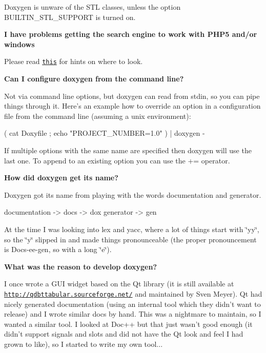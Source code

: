 \begin{DoxyEnumerate}
Doxygen is unware of the STL classes, unless the option BUILTIN\_\-STL\_\-SUPPORT is turned on.


\item {\bfseries I have problems getting the search engine to work with PHP5 and/or windows}

Please read \href{searchengine.html}{\tt this} for hints on where to look.


\item {\bfseries Can I configure doxygen from the command line?}

Not via command line options, but doxygen can read from {\ttfamily stdin}, so you can pipe things through it. Here's an example how to override an option in a configuration file from the command line (assuming a unix environment):

\begin{DoxyVerb}
( cat Doxyfile ; echo "PROJECT_NUMBER=1.0" ) | doxygen -
\end{DoxyVerb}


If multiple options with the same name are specified then doxygen will use the last one. To append to an existing option you can use the += operator.


\item {\bfseries How did doxygen get its name?}

Doxygen got its name from playing with the words documentation and generator.

\begin{DoxyVerb}
documentation -> docs -> dox
generator -> gen
\end{DoxyVerb}


At the time I was looking into lex and yacc, where a lot of things start with \char`\"{}yy\char`\"{}, so the \char`\"{}y\char`\"{} slipped in and made things pronounceable (the proper pronouncement is Docs-\/ee-\/gen, so with a long \char`\"{}e\char`\"{}).


\item {\bfseries What was the reason to develop doxygen?}

I once wrote a GUI widget based on the Qt library (it is still available at \href{http://qdbttabular.sourceforge.net/}{\tt http://qdbttabular.sourceforge.net/} and maintained by Sven Meyer). Qt had nicely generated documentation (using an internal tool which they didn't want to release) and I wrote similar docs by hand. This was a nightmare to maintain, so I wanted a similar tool. I looked at Doc++ but that just wasn't good enough (it didn't support signals and slots and did not have the Qt look and feel I had grown to like), so I started to write my own tool...


\end{DoxyEnumerate}

 